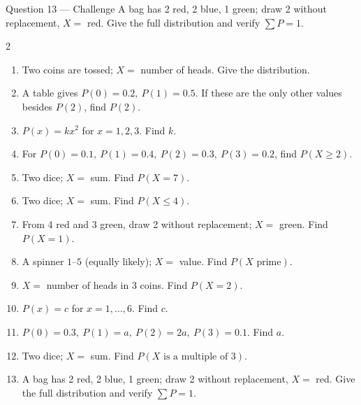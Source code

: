 \documentclass[11pt]{article}
\begin{document}
\begin{qbox}{Question 13 --- Challenge}
A bag has 2 red, 2 blue, 1 green; draw 2 without replacement, $X=$ red. Give the full distribution and verify $\sum P=1$.\workspace{3.4cm}
\end{qbox}

\clearpage
{}

\begin{recapbox}
\begin{multicols}{2}
\small
\begin{enumerate}[leftmargin=*,itemsep=3pt]
  \item Two coins are tossed; $X=$ number of heads. Give the distribution.
  \item A table gives $P(0)=0.2,\ P(1)=0.5$. If these are the only other values besides $P(2)$, find $P(2)$.
  \item $P(x)=kx^2$ for $x=1,2,3$. Find $k$.
  \item For $P(0)=0.1,\ P(1)=0.4,\ P(2)=0.3,\ P(3)=0.2$, find $P(X\ge2)$.
  \item Two dice; $X=$ sum. Find $P(X=7)$.
  \item Two dice; $X=$ sum. Find $P(X\le4)$.
  \item From 4 red and 3 green, draw 2 without replacement; $X=$ green. Find $P(X=1)$.
  \item A spinner $1$--$5$ (equally likely); $X=$ value. Find $P(X\text{ prime})$.
  \item $X=$ number of heads in 3 coins. Find $P(X=2)$.
  \item $P(x)=c$ for $x=1,\dots,6$. Find $c$.
  \item $P(0)=0.3,\ P(1)=a,\ P(2)=2a,\ P(3)=0.1$. Find $a$.
  \item Two dice; $X=$ sum. Find $P(X\text{ is a multiple of }3)$.
  \item A bag has 2 red, 2 blue, 1 green; draw 2 without replacement, $X=$ red. Give the full distribution and verify $\sum P=1$.
\end{enumerate}
\end{multicols}
\end{recapbox}
\end{document}
